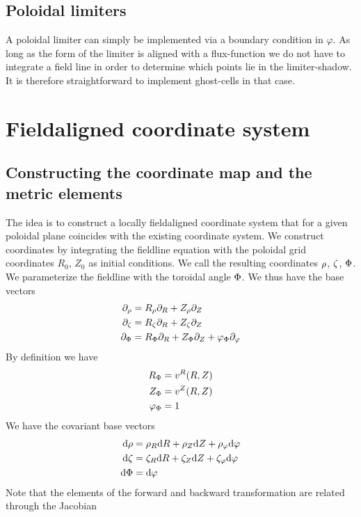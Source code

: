 \subsection{Poloidal limiters}
A poloidal limiter can simply be implemented via a boundary condition in $\varphi$.
As long as the form of the limiter is aligned with a flux-function we do not have to
integrate a field line in order to determine which points lie in the
limiter-shadow. It is therefore straightforward to implement ghost-cells
in that case.


\section{Fieldaligned coordinate system}
\subsection{Constructing the coordinate map and the metric elements}
The idea is to construct a locally fieldaligned coordinate system that
for a given poloidal plane coincides with the existing coordinate system.
We construct coordinates by integrating the fieldline equation with
 the poloidal grid coordinates $R_0$, $Z_0$ as initial conditions.
 We call the resulting coordinates ${\rho}$, ${\zeta}$, ${\Phi}$.
 We parameterize the fieldline with the toroidal angle ${\Phi}$.
 We thus have the base vectors
 \begin{align}
 \partial_{\rho} &= R_{\rho} \partial_R + Z_{\rho}\partial_Z \\
 \partial_{\zeta} &= R_{\zeta} \partial_R + Z_{\zeta}\partial_Z \\
 \partial_{\Phi} &= R_{\Phi} \partial_R + Z_{\Phi}\partial_Z + \varphi_{\Phi}\partial_\varphi
 \end{align}
 By definition we have
 \begin{align}
 R_{\Phi} &= v^R(R,Z) \\
 Z_{\Phi} &= v^Z(R,Z) \\
 \varphi_{\Phi} &= 1
 \end{align}
 We have the covariant base vectors
 \begin{align}
\mathrm{d} {\rho} &= {\rho}_R\mathrm{d} R  + {\rho}_Z \mathrm{d} Z + {\rho}_\varphi \mathrm{d}\varphi \\
\mathrm{d} {\zeta} &= {\zeta}_R\mathrm{d} R  + {\zeta}_Z \mathrm{d} Z + {\zeta}_\varphi \mathrm{d}\varphi \\
\mathrm{d} {\Phi} &=  \mathrm{d}\varphi
\end{align}
Note that the elements of the forward and backward transformation are related through the
Jacobian
